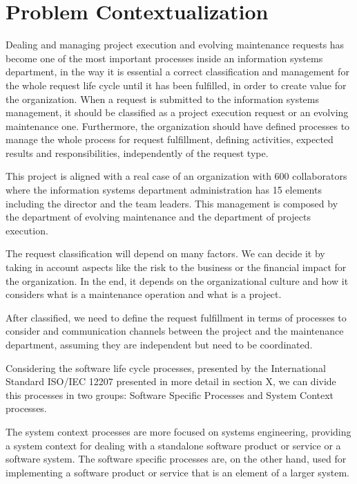 
% 
% 

\section{Problem Contextualization}


Dealing and managing project execution and evolving maintenance requests has become one of the most important processes inside an information systems department, in the way it is essential a correct classification and management for the whole request life cycle until it has been fulfilled, in order to create value for the organization.
When a request is submitted to the information systems management, it should be classified as a project execution request or an evolving maintenance one. Furthermore, the organization should have defined processes to manage the whole process for request fulfillment, defining activities, expected results and responsibilities, independently of the request type.\par
This project is aligned with a real case of an organization with 600 collaborators where the information systems department administration has 15 elements including the director and the team leaders. This management is composed by the department of evolving maintenance and the department of projects execution.\par
The request classification will depend on many factors. We can decide it by taking in account aspects like the risk to the business or the financial impact for the organization. In the end, it depends on the organizational culture and how it considers what is a maintenance operation and what is a project.\par
After classified, we need to define the request fulfillment in terms of processes to consider and communication channels between the project and the maintenance department, assuming they are independent but need to be coordinated.\par
Considering the software life cycle processes, presented by the International Standard ISO/IEC 12207\cite{ISO12207} presented in more detail in section X, we can divide this processes in two groups: Software Specific Processes and System Context processes.\par
The system context processes are more focused on systems engineering, providing a system context for dealing with a standalone software product or service or a software system. The software specific processes are, on the other hand, used for implementing a software product or service that is an element of a larger system. \par 
